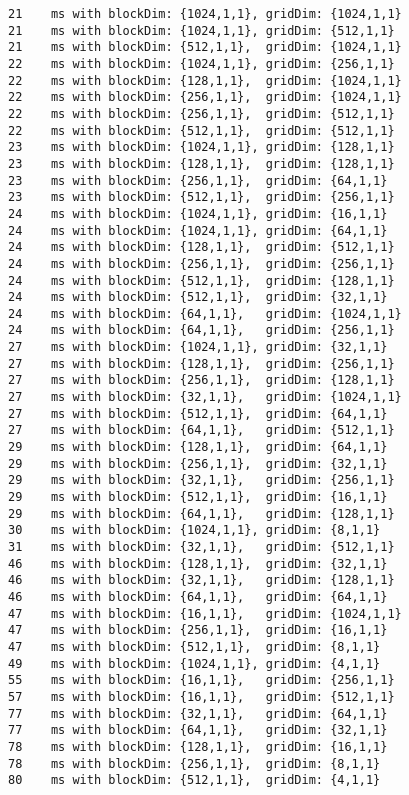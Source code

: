 \begin{lstlisting}
21    ms with blockDim: {1024,1,1}, gridDim: {1024,1,1}
21    ms with blockDim: {1024,1,1}, gridDim: {512,1,1}
21    ms with blockDim: {512,1,1},  gridDim: {1024,1,1}
22    ms with blockDim: {1024,1,1}, gridDim: {256,1,1}
22    ms with blockDim: {128,1,1},  gridDim: {1024,1,1}
22    ms with blockDim: {256,1,1},  gridDim: {1024,1,1}
22    ms with blockDim: {256,1,1},  gridDim: {512,1,1}
22    ms with blockDim: {512,1,1},  gridDim: {512,1,1}
23    ms with blockDim: {1024,1,1}, gridDim: {128,1,1}
23    ms with blockDim: {128,1,1},  gridDim: {128,1,1}
23    ms with blockDim: {256,1,1},  gridDim: {64,1,1}
23    ms with blockDim: {512,1,1},  gridDim: {256,1,1}
24    ms with blockDim: {1024,1,1}, gridDim: {16,1,1}
24    ms with blockDim: {1024,1,1}, gridDim: {64,1,1}
24    ms with blockDim: {128,1,1},  gridDim: {512,1,1}
24    ms with blockDim: {256,1,1},  gridDim: {256,1,1}
24    ms with blockDim: {512,1,1},  gridDim: {128,1,1}
24    ms with blockDim: {512,1,1},  gridDim: {32,1,1}
24    ms with blockDim: {64,1,1},   gridDim: {1024,1,1}
24    ms with blockDim: {64,1,1},   gridDim: {256,1,1}
27    ms with blockDim: {1024,1,1}, gridDim: {32,1,1}
27    ms with blockDim: {128,1,1},  gridDim: {256,1,1}
27    ms with blockDim: {256,1,1},  gridDim: {128,1,1}
27    ms with blockDim: {32,1,1},   gridDim: {1024,1,1}
27    ms with blockDim: {512,1,1},  gridDim: {64,1,1}
27    ms with blockDim: {64,1,1},   gridDim: {512,1,1}
29    ms with blockDim: {128,1,1},  gridDim: {64,1,1}
29    ms with blockDim: {256,1,1},  gridDim: {32,1,1}
29    ms with blockDim: {32,1,1},   gridDim: {256,1,1}
29    ms with blockDim: {512,1,1},  gridDim: {16,1,1}
29    ms with blockDim: {64,1,1},   gridDim: {128,1,1}
30    ms with blockDim: {1024,1,1}, gridDim: {8,1,1}
31    ms with blockDim: {32,1,1},   gridDim: {512,1,1}
46    ms with blockDim: {128,1,1},  gridDim: {32,1,1}
46    ms with blockDim: {32,1,1},   gridDim: {128,1,1}
46    ms with blockDim: {64,1,1},   gridDim: {64,1,1}
47    ms with blockDim: {16,1,1},   gridDim: {1024,1,1}
47    ms with blockDim: {256,1,1},  gridDim: {16,1,1}
47    ms with blockDim: {512,1,1},  gridDim: {8,1,1}
49    ms with blockDim: {1024,1,1}, gridDim: {4,1,1}
55    ms with blockDim: {16,1,1},   gridDim: {256,1,1}
57    ms with blockDim: {16,1,1},   gridDim: {512,1,1}
77    ms with blockDim: {32,1,1},   gridDim: {64,1,1}
77    ms with blockDim: {64,1,1},   gridDim: {32,1,1}
78    ms with blockDim: {128,1,1},  gridDim: {16,1,1}
78    ms with blockDim: {256,1,1},  gridDim: {8,1,1}
80    ms with blockDim: {512,1,1},  gridDim: {4,1,1}

\end{lstlisting}
